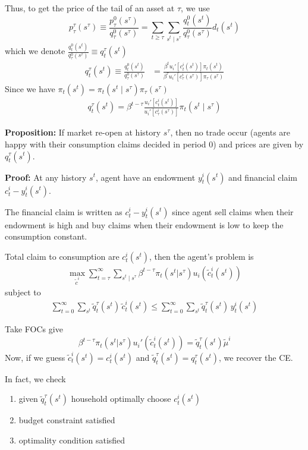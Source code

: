 \documentclass[twocolumn, fleqn]{article}
\numberwithin{equation}{section}
\begin{document}
	Thus, to get the price of the tail of an asset at $\tau$, we use 
	\begin{equation}
		p_\tau^\tau(s^\tau) \equiv \frac{p_\tau^0(s^\tau)}{q_\tau^0(s^\tau)} 
	= \sum_{t \geq \tau} \sum_{s^t \mid s^\tau} \frac{q_t^0(s^t)}{q_\tau^0(s^\tau)} d_t(s^t)
	\end{equation}
	which we denote $ \frac{q_t^0(s^t)}{q_\tau^0(s^\tau)}\equiv q_t^\tau(s^t)$
	\begin{align*}
		q_t^\tau(s^t) \equiv \frac{q_t^0(s^t)}{q_\tau^0(s^\tau)} 
	&= \frac{\beta^t u_i'\left[c_t^i(s^t)\right] \pi_t(s^t)}{\beta^\tau u_i'\left[c_\tau^i(s^\tau)\right] \pi_\tau(s^\tau)}
	\end{align*}
	Since we have $\pi_t(s^t) = \pi_t(s^t \mid s^\tau)\pi_\tau (s^\tau)$
	\begin{align*}
		q_t^\tau(s^t)= \beta^{t - \tau} \frac{u_i'\left[c_t^i(s^t)\right]}{u_i'\left[c_\tau^i(s^\tau)\right]} \pi_t(s^t \mid s^\tau)
	\end{align*}
	
	\textbf{Proposition:} If market re-open at history $s^\tau$, then no trade occur (agents are happy with their consumption claims decided in period 0) and prices are given by $q_t^\tau(s^t)$.
	
	\textbf{Proof:} At any history $s^t$, agent have an endowment $y_t^i(s^t)$ and financial claim $c_t^i - y_t^i(s^t)$.
	
	The financial claim is written as $c_t^i - y_t^i(s^t)$ since agent sell claims when their endowment is high and buy claims when their endowment is low to keep the consumption constant.
	
	Total claim to consumption are $c_t^i (s^t)$, then the agent's problem is 
	\begin{align*}
		\max_{\tilde c^i} \sum_{t=\tau}^{\infty} \sum_{s^t \mid s^\tau}  \beta^{t-\tau} \pi_t(s^t|s^\tau) u_i (\tilde{c}_t^i(s^t))
	\end{align*}
	subject to 
	\begin{align*}
		\sum_{t=0}^{\infty} \sum_{s^t} \tilde q_t^\tau(s^t) \, \tilde c_t^i(s^t) 
	\leq \sum_{t=0}^{\infty} \sum_{s^t} \tilde q_t^\tau(s^t) \, y_t^i(s^t)
	\end{align*}
	
	Take FOCs give 
	\[\beta^{t - \tau} \pi_t (s^t|s^\tau) u_i'(\tilde c_t^i (s^t))=\tilde q_t^\tau (s^t) \tilde \mu^i\]
	Now, if we guess $\tilde c_t^i (s^t) =  c_t^i (s^t)$ and $\tilde q_t^\tau (s^t) = q_t^\tau (s^t)$, we recover the CE.
	
	In fact, we check 
	\begin{enumerate}
		\item given $\tilde q_t^\tau (s^t)$ household optimally choose $ c_t^i (s^t)$
		\item budget constraint satisfied
		\item optimality condition satisfied
	\end{enumerate}
	
\end{document}
